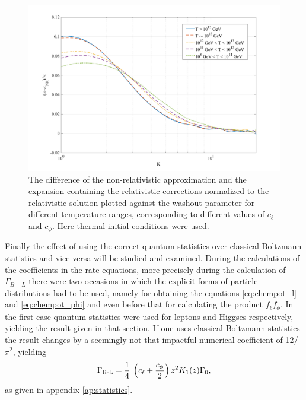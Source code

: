 \begin{figure}[H]
	\centering
	\includegraphics[width=\linewidth]{Images/corrections}
	\caption{The difference of the non-relativistic approximation and the expansion containing the relativistic corrections normalized to the relativistic solution plotted against the washout parameter for different temperature ranges, corresponding to different values of $c_\ell$ and $c_\phi$. Here thermal initial conditions were used.}
	\label{fig:corrections}
\end{figure}
Finally the effect of using the correct quantum statistics over classical Boltzmann statistics and vice versa will be studied and examined. 
During the calculations of the coefficients in the rate equations, more precisely during the calculation of $\Gamma_{B-L}$ there were two occasions in which the explicit forms of particle distributions had to be used, namely for obtaining the equations \eqref{eq:chempot_l} and \eqref{eq:chempot_phi} and even before that for calculating the product $f_\ell f_\phi$. \newline \indent
In the first case quantum statistics were used for leptons and Higgses respectively, yielding the result given in that section. If one uses classical Boltzmann statistics the result changes by a seemingly not that impactful numerical coefficient of 12/$\pi^2$, yielding
\begin{equation}
\Gamma\textsubscript{B-L}=\frac{1}{4}\:\left(c_\ell+\frac{c_\phi}{2}\right)z^2K_1(z)\Gamma_0,
\label{eq:Gamma_B-l_classical}
\end{equation}
as given in appendix \ref{ap:statistics}.
